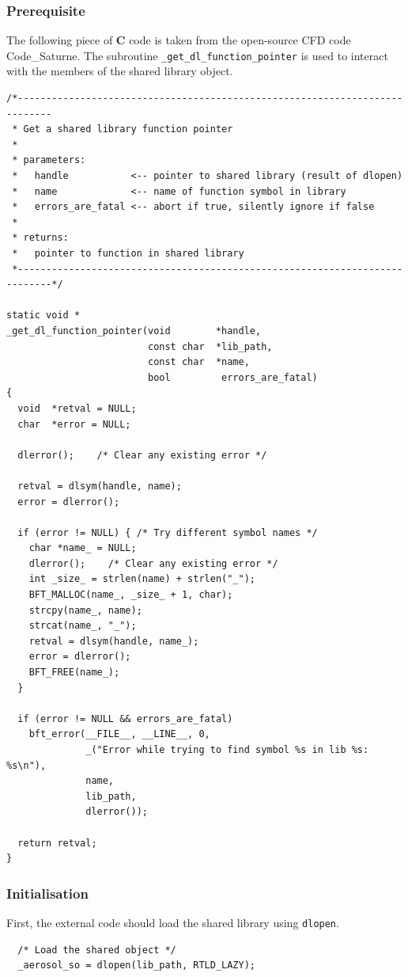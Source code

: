 \documentclass[a4paper,11pt]{article}
\begin{document}
\subsubsection*{Prerequisite}

The following piece of \textbf{C} code is taken from the open-source CFD code Code\_Saturne.
The subroutine \texttt{\_get\_dl\_function\_pointer} is used to interact with the members of the shared library object.

\begin{verbatim}
/*----------------------------------------------------------------------------
 * Get a shared library function pointer
 *
 * parameters:
 *   handle           <-- pointer to shared library (result of dlopen)
 *   name             <-- name of function symbol in library
 *   errors_are_fatal <-- abort if true, silently ignore if false
 *
 * returns:
 *   pointer to function in shared library
 *----------------------------------------------------------------------------*/

static void *
_get_dl_function_pointer(void        *handle,
                         const char  *lib_path,
                         const char  *name,
                         bool         errors_are_fatal)
{
  void  *retval = NULL;
  char  *error = NULL;

  dlerror();    /* Clear any existing error */

  retval = dlsym(handle, name);
  error = dlerror();

  if (error != NULL) { /* Try different symbol names */
    char *name_ = NULL;
    dlerror();    /* Clear any existing error */
    int _size_ = strlen(name) + strlen("_");
    BFT_MALLOC(name_, _size_ + 1, char);
    strcpy(name_, name);
    strcat(name_, "_");
    retval = dlsym(handle, name_);
    error = dlerror();
    BFT_FREE(name_);
  }

  if (error != NULL && errors_are_fatal)
    bft_error(__FILE__, __LINE__, 0,
              _("Error while trying to find symbol %s in lib %s: %s\n"),
              name,
              lib_path,
              dlerror());

  return retval;
}
\end{verbatim}

\subsubsection*{Initialisation}

First, the external code should load the shared library using \texttt{dlopen}.
\begin{verbatim}
  /* Load the shared object */
  _aerosol_so = dlopen(lib_path, RTLD_LAZY);
\end{verbatim}
\end{document}
